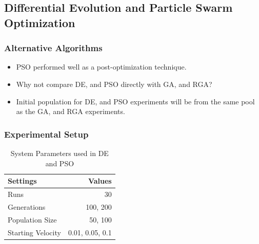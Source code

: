 \documentclass[10pt]{beamer}
\begin{document}
\subsection{Differential Evolution and Particle Swarm Optimization}

\begin{frame}
	\frametitle{Alternative Algorithms}

	\begin{itemize}
		\item PSO performed well as a post-optimization technique.
		\item Why not compare DE, and PSO directly with GA, and RGA?
		\item Initial population for DE, and PSO experiments will be from the same pool as the GA, and RGA experiments.
	\end{itemize}
\end{frame}

\begin{frame}
	\frametitle{Experimental Setup}

	\begin{table}
		\begin{tabular}{ | l | r | }
		  \hline
			Settings & Values \\ \hline \hline
			Runs & 30 \\ \hline
			Generations & 100, 200 \\ \hline
			Population Size & 50, 100 \\ \hline
			Starting Velocity & 0.01, 0.05, 0.1 \\ \hline
		\end{tabular}
		\caption{System Parameters used in DE and PSO}
	\end{table}

\end{frame}
\end{document}
